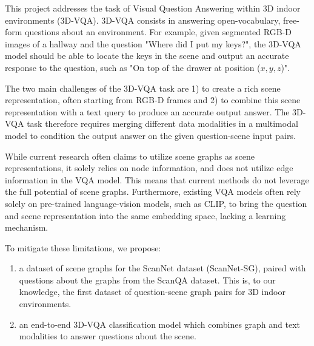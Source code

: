 This project addresses the task of Visual Question Answering within 3D indoor environments (3D-VQA). 3D-VQA consists in answering open-vocabulary, free-form questions about an environment. For example, given segmented RGB-D images of a hallway and the question "Where did I put my keys?", the 3D-VQA model should be able to locate the keys in the scene and output an accurate response to the question, such as "On top of the drawer at position ($x, y, z$)".

The two main challenges of the 3D-VQA task are 1) to create a rich scene representation, often starting from RGB-D frames and 2) to combine this scene representation with a text query to produce an accurate output answer. The 3D-VQA task therefore requires merging different data modalities in a multimodal model to condition the output answer on the given question-scene input pairs.

While current research often claims to utilize scene graphs as scene representations, it solely relies on node information, and does not utilize edge information in the VQA model. This means that current methods do not leverage the full potential of scene graphs. Furthermore, existing VQA models often rely solely on pre-trained language-vision models, such as CLIP, to bring the question and scene representation into the same embedding space, lacking a learning mechanism.

To mitigate these limitations, we propose:
\begin{enumerate}
    \item a dataset of scene graphs for the ScanNet dataset (ScanNet-SG), paired with questions about the graphs from the ScanQA dataset. This is, to our knowledge, the first dataset of question-scene graph pairs for 3D indoor environments.
    \item an end-to-end 3D-VQA classification model which combines graph and text modalities to answer questions about the scene.
\end{enumerate}

